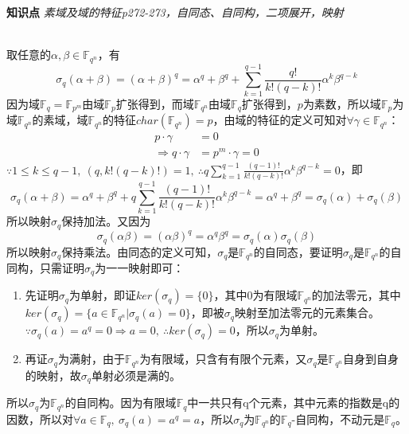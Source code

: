 \begin{tcolorbox}
    \textbf{知识点} 
    \textit{素域及域的特征p272-273，自同态、自同构，二项展开，映射}
\end{tcolorbox}
\begin{solution}\ \\
    取任意的$\alpha, \beta\in\mathbb{F}_{q^n}$，有
    \begin{equation*}
        \sigma_q(\alpha+\beta)=(\alpha+\beta)^q=\alpha^q+\beta^q+\sum\limits_{k=1}^{q-1}\frac{q!}{k!(q-k)!}\alpha^k\beta^{q-k}
    \end{equation*}
    因为域$\mathbb{F}_{q}=\mathbb{F}_{p^m}$由域$\mathbb{F}_{p}$扩张得到，而域$\mathbb{F}_{q^n}$由域$\mathbb{F}_{q}$扩张得到，$p$为素数，所以域$\mathbb{F}_{p}$为域$\mathbb{F}_{q^n}$的素域，域$\mathbb{F}_{q^n}$的特征$char(\mathbb{F}_{q^n})=p$，由域的特征的定义可知对$\forall\gamma\in\mathbb{F}_{q^n}$：
    \begin{equation*}
        \begin{aligned}
            p\cdot\gamma&=0\\ \Rightarrow q\cdot\gamma&=p^m\cdot\gamma=0
        \end{aligned}
    \end{equation*}
    $\because1\leq k\leq q-1,\ (q, k!(q-k)!)=1,\ \therefore q\sum\limits_{k=1}^{q-1}\frac{(q-1)!}{k!(q-k)!}\alpha^k\beta^{q-k}=0$，即
    \begin{equation*}
        \sigma_q(\alpha+\beta)=\alpha^q+\beta^q+q\sum\limits_{k=1}^{q-1}\frac{(q-1)!}{k!(q-k)!}\alpha^k\beta^{q-k}=\alpha^q+\beta^q=\sigma_q(\alpha)+\sigma_q(\beta)
    \end{equation*}
    所以映射$\sigma_q$保持加法。又因为
    \begin{equation*}
        \sigma_q(\alpha\beta)=(\alpha\beta)^q=\alpha^q\beta^q=\sigma_q(\alpha)\sigma_q(\beta)
    \end{equation*}
    所以映射$\sigma_q$保持乘法。由同态的定义可知，$\sigma_q$是$\mathbb{F}_{q^n}$的自同态，要证明$\sigma_q$是$\mathbb{F}_{q^n}$的自同构，只需证明$\sigma_q$为一一映射即可：
    \begin{enumerate}
        \item 先证明$\sigma_q$为单射，即证$ker(\sigma_q)=\{0\}$，其中0为有限域$\mathbb{F}_{q^n}$的加法零元，其中$ker(\sigma_q)=\{a\in\mathbb{F}_{q^n}|\sigma_q(a)=0\}$，即被$\sigma_q$映射至加法零元的元素集合。\\
        $\because\sigma_q(a)=a^q=0\Rightarrow a=0,\ \therefore ker(\sigma_q)={0}$，所以$\sigma_q$为单射。
        \item 再证$\sigma_q$为满射，由于$\mathbb{F}_{q^n}$为有限域，只含有有限个元素，又$\sigma_q$是$\mathbb{F}_{q^n}$自身到自身的映射，故$\sigma_q$单射必须是满的。
    \end{enumerate}
    所以$\sigma_q$为$\mathbb{F}_{q^n}$的自同构。因为有限域$\mathbb{F}_{q}$中一共只有q个元素，其中元素的指数是q的因数，所以对$\forall a\in\mathbb{F}_{q},\ \sigma_q(a)=a^q=a$，所以$\sigma_q$为$\mathbb{F}_{q^n}$的$\mathbb{F}_{q}$-自同构，不动元是$\mathbb{F}_{q}$。
\end{solution}